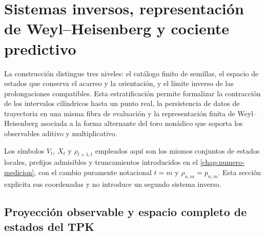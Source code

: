 \chapter{Sistemas inversos, representación de Weyl--Heisenberg y cociente predictivo}
\label{chap:numero-heisenberg-d108}

La construcción distingue tres niveles: el catálogo finito de semillas, el
espacio de estados que conserva el acarreo y la orientación, y el límite
inverso de las prolongaciones compatibles. Esta estratificación permite
formalizar la contracción de los intervalos cilíndricos hasta un punto real,
la persistencia de datos de trayectoria en una misma fibra de evaluación y
la representación finita de Weyl--Heisenberg asociada a la forma alternante
del toro nonádico que soporta los observables aditivo y multiplicativo.

Los símbolos \(V_t\), \(X_t\) y \(\rho_{t+1,t}\) empleados aquí son los
mismos conjuntos de estados locales, prefijos admisibles y truncamientos
introducidos en el \cref{chap:numero-medicion}, con el cambio puramente
notacional \(t=m\) y \(\rho_{n,m}=p_{n,m}\). Esta sección explicita sus
coordenadas y no introduce un segundo sistema inverso.

\section{Proyección observable y espacio completo de estados del TPK}

